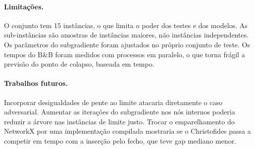 \paragraph{Limitações.} O conjunto tem 15 instâncias, o que limita o poder dos testes e
dos modelos. As sub-instâncias são amostras de instâncias maiores, não instâncias
independentes. Os parâmetros do subgradiente foram ajustados no próprio conjunto de
teste. Os tempos do B\&B foram medidos com processos em paralelo, o que torna frágil a
previsão do ponto de colapso, baseada em tempo.

\paragraph{Trabalhos futuros.} Incorporar desigualdades de pente ao limite atacaria
diretamente o caso adversarial. Aumentar as iterações do subgradiente nos nós internos
poderia reduzir a árvore nas instâncias de limite justo. Trocar o emparelhamento do
NetworkX por uma implementação compilada mostraria se o Christofides passa a competir em
tempo com a inserção pelo fecho, que teve gap mediano menor.
